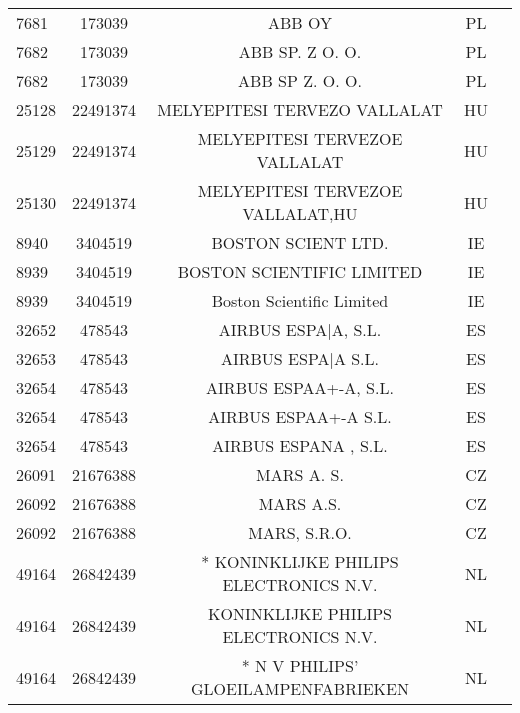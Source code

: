 \begin{longtable}{|l|c|c|c|c|}
      7681 &     173039 &                                             ABB OY &      PL \\
      7682 &     173039 &                                    ABB SP. Z O. O. &      PL \\
      7682 &     173039 &                                    ABB SP Z. O. O. &      PL \\
     25128 &   22491374 &                       MELYEPITESI TERVEZO VALLALAT &      HU \\
     25129 &   22491374 &                      MELYEPITESI TERVEZOE VALLALAT &      HU \\
     25130 &   22491374 &                   MELYEPITESI TERVEZOE VALLALAT,HU &      HU \\
      8940 &    3404519 &                                 BOSTON SCIENT LTD. &      IE \\
      8939 &    3404519 &                          BOSTON SCIENTIFIC LIMITED &      IE \\
      8939 &    3404519 &                          Boston Scientific Limited &      IE \\
     32652 &     478543 &                                AIRBUS ESPA|A, S.L. &      ES \\
     32653 &     478543 &                                 AIRBUS ESPA|A S.L. &      ES \\
     32654 &     478543 &                              AIRBUS ESPAA+-A, S.L. &      ES \\
     32654 &     478543 &                               AIRBUS ESPAA+-A S.L. &      ES \\
     32654 &     478543 &                               AIRBUS ESPANA , S.L. &      ES \\
     26091 &   21676388 &                                         MARS A. S. &      CZ \\
     26092 &   21676388 &                                          MARS A.S. &      CZ \\
     26092 &   21676388 &                                       MARS, S.R.O. &      CZ \\
     49164 &   26842439 &             * KONINKLIJKE PHILIPS ELECTRONICS N.V. &      NL \\
     49164 &   26842439 &               KONINKLIJKE PHILIPS ELECTRONICS N.V. &      NL \\
     49164 &   26842439 &                * N V PHILIPS' GLOEILAMPENFABRIEKEN &      NL \\

\end{longtable}
